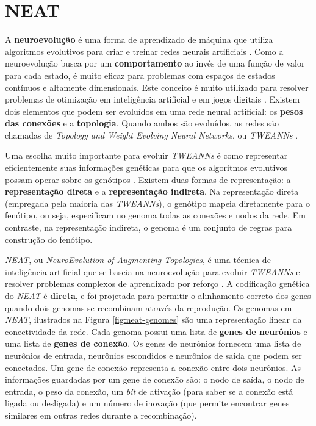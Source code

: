 \section{\label{section:neat}NEAT}
A \textbf{neuroevolução} é uma forma de aprendizado de máquina que utiliza
algoritmos evolutivos para criar e treinar redes neurais artificiais \cite[Cap.
4]{HandbookNeuroevolution}. Como a neuroevolução busca por um
\textbf{comportamento} ao invés de uma função de valor para cada estado, é muito
eficaz para problemas com espaços de estados contínuos e altamente dimensionais.
Este conceito é muito utilizado para resolver problemas de otimização em
inteligência artificial e em jogos digitais \cite{DBLP:journals/corr/RisiT14}.
Existem dois elementos que podem ser evoluídos em uma rede neural artificial: os
\textbf{pesos das conexões} e a \textbf{topologia}. Quando ambos são evoluídos,
as redes são chamadas de \textit{Topology and Weight Evolving Neural Networks},
ou \textit{TWEANNs} \cite[Cap. 4]{HandbookNeuroevolution}.

Uma escolha muito importante para evoluir \textit{TWEANNs} é como representar
eficientemente suas informações genéticas para que os algoritmos evolutivos
possam operar sobre os genótipos \cite[Cap. 4]{HandbookNeuroevolution}. Existem
duas formas de representação: a \textbf{representação direta} e a
\textbf{representação indireta}. Na representação direta (empregada pela maioria
das \textit{TWEANNs}), o genótipo mapeia diretamente para o fenótipo, ou seja,
especificam no genoma todas as conexões e nodos da rede. Em contraste, na
representação indireta, o genoma é um conjunto de regras para construção do
fenótipo. 

\textit{NEAT}, ou \textit{NeuroEvolution of Augmenting Topologies}, é uma
técnica de inteligência artificial que se baseia na neuroevolução para evoluir
\textit{TWEANNs} e resolver problemas complexos de aprendizado por reforço
\cite{stanley:ec02}. A codificação genética do \textit{NEAT} é \textbf{direta},
e foi projetada para permitir o alinhamento correto dos genes quando dois
genomas se recombinam através da reprodução. Os genomas em \textit{NEAT},
ilustrados na Figura \ref{fig:neat-genomes} são uma representação linear da
conectividade da rede.  Cada genoma possui uma lista de \textbf{genes de
neurônios} e uma lista de \textbf{genes de conexão}. Os genes de neurônios
fornecem uma lista de neurônios de entrada, neurônios escondidos e neurônios de
saída que podem ser conectados.  Um gene de conexão representa a conexão entre
dois neurônios. As informações guardadas por um gene de conexão são: o nodo de
saída, o nodo de entrada, o peso da conexão, um \textit{bit} de ativação (para
saber se a conexão está ligada ou desligada) e um número de inovação (que
permite encontrar genes similares em outras redes durante a recombinação). 

